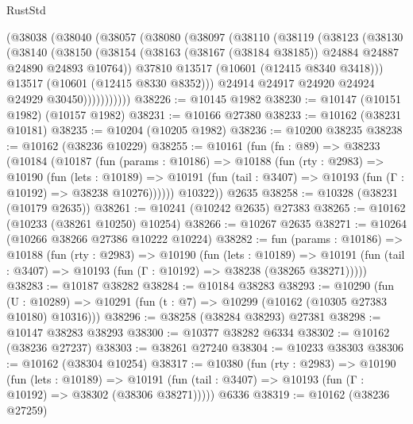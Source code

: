 \begin{lexlean}{RustStd}
\begin{coremodule}
        (@38038
          (@38040
            (@38057
              (@38080
                (@38097
                  (@38110
                    (@38119
                      (@38123
                        (@38130
                          (@38140
                            (@38150
                              (@38154
                                (@38163
                                  (@38167 (@38184 @38185))
                                  @24884
                                  @24887
                                  @24890
                                  @24893
                                  @10764))
                              @37810
                              @13517
                              (@10601 (@12415 @8340 @3418)))
                            @13517
                            (@10601 (@12415 @8330 @8352)))
                          @24914
                          @24917
                          @24920
                          @24924
                          @24929
                          @30450)))))))))))
@38226 := @10145 @1982
@38230 := @10147 (@10151 @1982) (@10157 @1982)
@38231 := @10166 @27380
@38233 := @10162 (@38231 @10181)
@38235 := @10204 (@10205 @1982)
@38236 := @10200 @38235
@38238 := @10162 (@38236 @10229)
@38255 := @10161
    (fun (fn : @89) =>
    @38233
      (@10184
        (@10187
          (fun (params : @10186) =>
          @10188
            (fun (rty : @2983) =>
            @10190
              (fun (lets : @10189) =>
              @10191 (fun (tail : @3407) => @10193 (fun (Γ : @10192) => @38238 @10276))))))
        @10322))
    @2635
@38258 := @10328 (@38231 (@10179 @2635))
@38261 := @10241 (@10242 @2635) @27383
@38265 := @10162 (@10233 (@38261 @10250) @10254)
@38266 := @10267 @2635
@38271 := @10264 (@10266 @38266 @27386 @10222 @10224)
@38282 := fun (params : @10186) =>
  @10188
    (fun (rty : @2983) =>
    @10190
      (fun (lets : @10189) =>
      @10191 (fun (tail : @3407) => @10193 (fun (Γ : @10192) => @38238 (@38265 @38271)))))
@38283 := @10187 @38282
@38284 := @10184 @38283
@38293 := @10290
    (fun (U : @10289) => @10291 (fun (t : @7) => @10299 (@10162 (@10305 @27383 @10180) @10316)))
@38296 := @38258 (@38284 @38293) @27381
@38298 := @10147 @38283 @38293
@38300 := @10377 @38282 @6334
@38302 := @10162 (@38236 @27237)
@38303 := @38261 @27240
@38304 := @10233 @38303
@38306 := @10162 (@38304 @10254)
@38317 := @10380
    (fun (rty : @2983) =>
    @10190
      (fun (lets : @10189) =>
      @10191 (fun (tail : @3407) => @10193 (fun (Γ : @10192) => @38302 (@38306 @38271)))))
    @6336
@38319 := @10162 (@38236 @27259)

\end{coremodule}
\end{lexlean}
